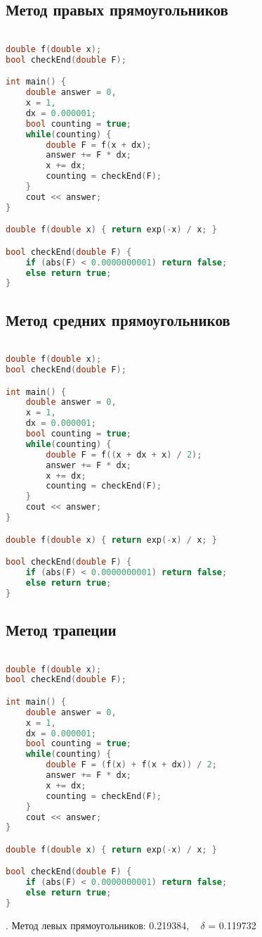\documentclass[14pt, titlepage, fleqn]{extarticle}
\begin{document}
	\newpage
	\subsection*{Метод правых прямоугольников}
	\begin{lstlisting}[language=C++, basicstyle=\footnotesize\ttfamily, frame = single]

double f(double x);
bool checkEnd(double F);

int main() {
	double answer = 0, 
	x = 1, 
	dx = 0.000001;
	bool counting = true;
	while(counting) {		
		double F = f(x + dx);
		answer += F * dx;
		x += dx;
		counting = checkEnd(F);		
	}
	cout << answer;
}

double f(double x) { return exp(-x) / x; }

bool checkEnd(double F) {
	if (abs(F) < 0.0000000001) return false;
	else return true;
}

	\end{lstlisting}

	\newpage
	\subsection*{Метод средних прямоугольников}
	\begin{lstlisting}[language=C++, basicstyle=\footnotesize\ttfamily, frame = single]

double f(double x);
bool checkEnd(double F);

int main() {
	double answer = 0, 
	x = 1, 
	dx = 0.000001;
	bool counting = true;
	while(counting) {		
		double F = f((x + dx + x) / 2);
		answer += F * dx;
		x += dx;
		counting = checkEnd(F);		
	}
	cout << answer;
}

double f(double x) { return exp(-x) / x; }

bool checkEnd(double F) {
	if (abs(F) < 0.0000000001) return false;
	else return true;
}

	\end{lstlisting}

	\newpage
	\subsection*{Метод трапеции}
	\begin{lstlisting}[language=C++, basicstyle=\footnotesize\ttfamily, frame = single]

double f(double x);
bool checkEnd(double F);

int main() {
	double answer = 0, 
	x = 1, 
	dx = 0.000001;
	bool counting = true;
	while(counting) {		
		double F = (f(x) + f(x + dx)) / 2;
		answer += F * dx;
		x += dx;
		counting = checkEnd(F);		
	}
	cout << answer;
}

double f(double x) { return exp(-x) / x; }

bool checkEnd(double F) {
	if (abs(F) < 0.0000000001) return false;
	else return true;
}

	\end{lstlisting}
. Метод левых прямоугольников:  0.219384, ~ $\delta$ = 0.119732\\
\end{document}
